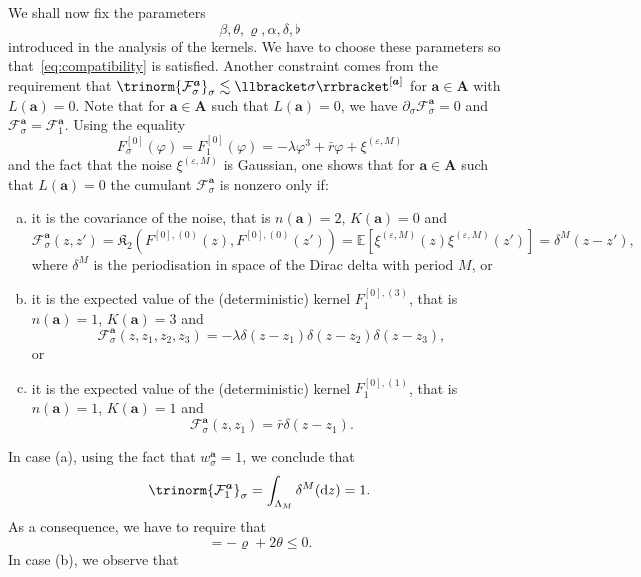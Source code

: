 \documentclass{article}
\numberwithin{equation}{section}
\newcommand{\mathd}{\mathrm{d}}
\theoremstyle{plain}
\theoremstyle{definition}
\begin{document}
We shall now fix the parameters
\[ \beta, \theta, \varrho, \alpha, \delta, \flat \]
introduced in the analysis of the kernels. We have to choose these parameters
so that~\eqref{eq:compatibility} is satisfied. Another constraint comes from
the requirement that $\trinorm{ \mathcal{F}^{\boldsymbol{a}}_{\sigma}
}_{\sigma} \lesssim \llbracket \sigma \rrbracket^{ [\boldsymbol{a}]}$
for $\boldsymbol{a} \in \boldsymbol{A}$ with $L (\boldsymbol{a}) = 0$. Note that for
$\boldsymbol{a} \in \boldsymbol{A}$ such that $L (\boldsymbol{a}) = 0$, we have
$\partial_{\sigma} \mathcal{F}^{\boldsymbol{a}}_{\sigma} = 0$ and
$\mathcal{F}^{\boldsymbol{a}}_{\sigma} =\mathcal{F}^{\boldsymbol{a}}_1$. Using the
equality
\[ F^{[0]}_{\sigma} (\varphi) = F^{[0]}_1 (\varphi) = - \lambda \varphi^3 +
   \bar{r}  \varphi  + \xi^{(\varepsilon, M)} \]
and the fact that the noise $\xi^{(\varepsilon, M)}$ is Gaussian, one shows
that for $\boldsymbol{a} \in \boldsymbol{A}$ such that $L (\boldsymbol{a}) = 0$ the
cumulant $\mathcal{F}^{\boldsymbol{a}}_{\sigma}$ is nonzero only if:
\begin{enumerate}[(a)]
  \item it is the covariance of the noise, that is $n (\boldsymbol{a}) = 2$, $K(\boldsymbol{a}) = 0$ and
  \[ \mathcal{F}^{\boldsymbol{a}}_{\sigma} (z, z') =\mathfrak{K}_2 (F^{[0], (0)}
     (z), F^{[0], (0)} (z')) =\mathbb{E} [\xi^{(\varepsilon, M)} (z)
     \xi^{(\varepsilon, M)} (z')] = \delta^M (z - z'), \]
  where $\delta^M$ is the periodisation in space of the Dirac
  delta with period $M$, or
  
  \item it is the expected value of the (deterministic) kernel $F^{[0],
  (3)}_1$, that is $n (\boldsymbol{a}) = 1$, $K (\boldsymbol{a}) = 3$ and
  \[ \mathcal{F}^{\boldsymbol{a}}_{\sigma} (z, z_1, z_2, z_3) = - \lambda \delta
     (z - z_1) \delta (z - z_2) \delta (z - z_3), \]
  or
  
  \item it is the expected value of the (deterministic) kernel $F^{[0],
  (1)}_1$, that is $n (\boldsymbol{a}) = 1$, $K (\boldsymbol{a}) = 1$ and
  \[ \mathcal{F}^{\boldsymbol{a}}_{\sigma} (z, z_1) = \bar{r} \delta (z - z_1) .
  \]
\end{enumerate}
In case (a), using the fact that $w_{\sigma}^{\boldsymbol{a}}
= 1$, we conclude that
\begin{equation}
  {\trinorm{ \mathcal{F}^{\boldsymbol{a}}_1 }_{\sigma}}  = \int_{\Lambda_M} \delta^M
  (\mathd z) = 1. \label{eq:est-cov-noise}
\end{equation}
As a consequence, we have to require that
\begin{equation}
  [\boldsymbol{a}] = - \varrho + 2 \theta \leqslant 0. \label{eq:two-point}
\end{equation}
In case (b), we observe that
\end{document}
